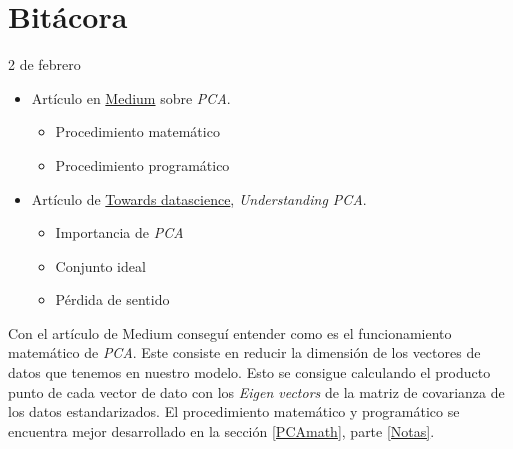 
\maketitle

\part{Bitácora}
\begin{entry}{2 de febrero}
\tcbsubtitle{\LBlimportant}
\begin{itemize}
    \item Artículo en \href{https://medium.com/codex/principal-component-analysis-pca-how-it-works-mathematically-d5de4c7138e6}{Medium} sobre \textit{PCA}.
    \begin{itemize}
        \item Procedimiento matemático
        \item Procedimiento programático
    \end{itemize}
    
    \item Artículo de \href{https://towardsdatascience.com/understanding-pca-fae3e243731d}{Towards datascience}, \textit{Understanding PCA}.
    \begin{itemize}
        \item Importancia de \textit{PCA}
        \item Conjunto ideal
        \item Pérdida de sentido
    \end{itemize}
\end{itemize}
\tcblower
\tcbsubtitle{\LBlsummary}
Con el artículo de Medium conseguí entender como es el funcionamiento matemático de \textit{PCA}. Este consiste en reducir la dimensión de los vectores de datos que tenemos en nuestro modelo. Esto se consigue calculando el producto punto de cada vector de dato con los \textit{Eigen vectors} de la matriz de covarianza de los datos estandarizados. El procedimiento matemático y programático se encuentra mejor desarrollado en la sección \ref{PCAmath}, parte \ref{Notas}.\\


\end{entry}
